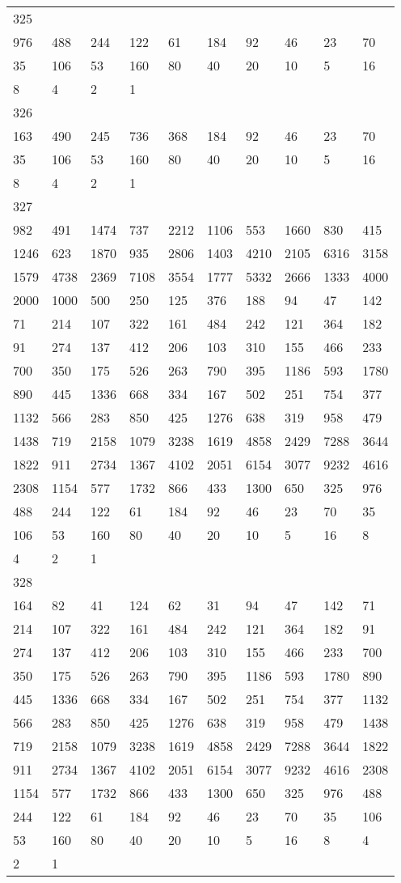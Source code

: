 \begin{longtable}{*{10}{l}}
325&&&&&&&&&\\
976& 488& 244& 122& 61& 184& 92& 46& 23& 70\\
35& 106& 53& 160& 80& 40& 20& 10& 5& 16\\
8& 4& 2& 1& \\

326&&&&&&&&&\\
163& 490& 245& 736& 368& 184& 92& 46& 23& 70\\
35& 106& 53& 160& 80& 40& 20& 10& 5& 16\\
8& 4& 2& 1& \\

327&&&&&&&&&\\
982& 491& 1474& 737& 2212& 1106& 553& 1660& 830& 415\\
1246& 623& 1870& 935& 2806& 1403& 4210& 2105& 6316& 3158\\
1579& 4738& 2369& 7108& 3554& 1777& 5332& 2666& 1333& 4000\\
2000& 1000& 500& 250& 125& 376& 188& 94& 47& 142\\
71& 214& 107& 322& 161& 484& 242& 121& 364& 182\\
91& 274& 137& 412& 206& 103& 310& 155& 466& 233\\
700& 350& 175& 526& 263& 790& 395& 1186& 593& 1780\\
890& 445& 1336& 668& 334& 167& 502& 251& 754& 377\\
1132& 566& 283& 850& 425& 1276& 638& 319& 958& 479\\
1438& 719& 2158& 1079& 3238& 1619& 4858& 2429& 7288& 3644\\
1822& 911& 2734& 1367& 4102& 2051& 6154& 3077& 9232& 4616\\
2308& 1154& 577& 1732& 866& 433& 1300& 650& 325& 976\\
488& 244& 122& 61& 184& 92& 46& 23& 70& 35\\
106& 53& 160& 80& 40& 20& 10& 5& 16& 8\\
4& 2& 1& \\

328&&&&&&&&&\\
164& 82& 41& 124& 62& 31& 94& 47& 142& 71\\
214& 107& 322& 161& 484& 242& 121& 364& 182& 91\\
274& 137& 412& 206& 103& 310& 155& 466& 233& 700\\
350& 175& 526& 263& 790& 395& 1186& 593& 1780& 890\\
445& 1336& 668& 334& 167& 502& 251& 754& 377& 1132\\
566& 283& 850& 425& 1276& 638& 319& 958& 479& 1438\\
719& 2158& 1079& 3238& 1619& 4858& 2429& 7288& 3644& 1822\\
911& 2734& 1367& 4102& 2051& 6154& 3077& 9232& 4616& 2308\\
1154& 577& 1732& 866& 433& 1300& 650& 325& 976& 488\\
244& 122& 61& 184& 92& 46& 23& 70& 35& 106\\
53& 160& 80& 40& 20& 10& 5& 16& 8& 4\\
2& 1& \\


\end{longtable}
